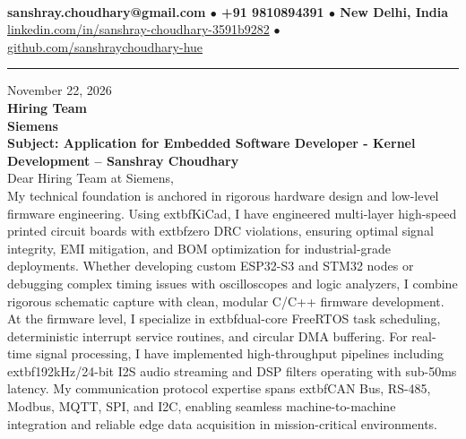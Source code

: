 \documentclass[10pt,a4paper]{article}%
\begin{document}
%
 \vspace{3pt}\\%
\noindent \textbf{\footnotesize sanshray.choudhary@gmail.com $\bullet$ +91 9810894391 $\bullet$ New Delhi, India}\\%
\noindent \href{https://www.linkedin.com/in/sanshray-choudhary-3591b9282}{linkedin.com/in/sanshray-choudhary-3591b9282} $\bullet$ \href{https://github.com/sanshraychoudhary-hue}{github.com/sanshraychoudhary-hue} \vspace{12pt}%
\hrule \vspace{18pt}%

\noindent November 22, 2026 \vspace{12pt}\\%
\noindent \textbf{Hiring Team} \\%
\noindent \textbf{Siemens} \vspace{16pt}\\%

\noindent \textbf{Subject: Application for Embedded Software Developer - Kernel Development -- Sanshray Choudhary} \vspace{12pt}\\%

\noindent Dear Hiring Team at Siemens, \vspace{8pt}\\%

\noindent My technical foundation is anchored in rigorous hardware design and low-level firmware engineering. Using 	extbf{KiCad}, I have engineered multi-layer high-speed printed circuit boards with 	extbf{zero DRC violations}, ensuring optimal signal integrity, EMI mitigation, and BOM optimization for industrial-grade deployments. Whether developing custom ESP32-S3 and STM32 nodes or debugging complex timing issues with oscilloscopes and logic analyzers, I combine rigorous schematic capture with clean, modular C/C++ firmware development. \vspace{8pt}\\

\noindent At the firmware level, I specialize in 	extbf{dual-core FreeRTOS task scheduling}, deterministic interrupt service routines, and circular DMA buffering. For real-time signal processing, I have implemented high-throughput pipelines including 	extbf{192kHz/24-bit I2S audio streaming} and DSP filters operating with sub-50ms latency. My communication protocol expertise spans 	extbf{CAN Bus, RS-485, Modbus, MQTT, SPI, and I2C}, enabling seamless machine-to-machine integration and reliable edge data acquisition in mission-critical environments. \vspace{8pt}\\
\end{document}
